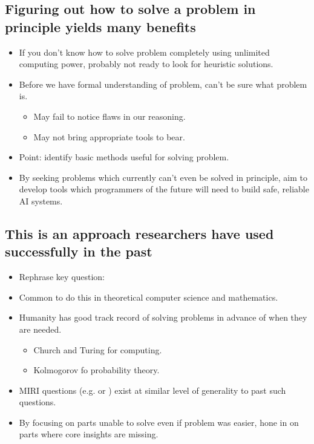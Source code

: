 \subsection{Figuring out how to solve a problem in principle yields many benefits}

\begin{itemize}
    \item If you don't know how to solve problem completely using unlimited computing power, probably not ready to look for heuristic solutions.
    \item Before we have formal understanding of problem, can't be sure what problem is.
    \begin{itemize}
        \item May fail to notice flaws in our reasoning.
        \item May not bring appropriate tools to bear.
    \end{itemize}
    \item Point: identify basic methods useful for solving problem.
    \item By seeking problems which currently can't even be solved in principle, aim to develop tools which programmers of the future will need to build safe, reliable AI systems.
\end{itemize}


\subsection{This is an approach researchers have used successfully in the past}

\begin{itemize}
    \item Rephrase key question: 
    \item Common to do this in theoretical computer science and mathematics.
    \item Humanity has good track record of solving problems in advance of when they are needed.
    \begin{itemize}
        \item Church and Turing for computing.
        \item Kolmogorov fo probability theory.
    \end{itemize}
    \item MIRI questions (e.g.\@ {} or ) exist at similar level of generality to past such questions.
    \item By focusing on parts unable to solve even if problem was easier, hone in on parts where core insights are missing.
\end{itemize}